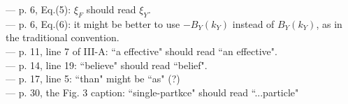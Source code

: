 \vspace{0.5cm}
\noindent 
--- p. 6, Eq.(5): $\xi_F$ should read $\xi_Y$. \\
--- p. 6, Eq.(6): it might be better to use $-B_Y(k_Y)$ instead 
  of $B_Y(k_Y)$, as in the traditional convention. \\
--- p. 11, line 7 of III-A: ``a effective" should read ``an effective".\\ 
--- p. 14, line 19: ``believe" should read ``belief". \\
--- p. 17, line 5: ``than" might be ``as" (?) \\
--- p. 30, the Fig. 3 caption: ``single-partkce" should read 
     ``...particle" \\







